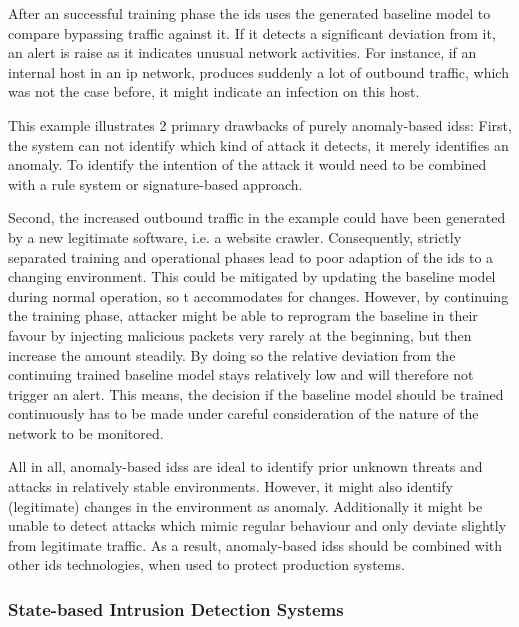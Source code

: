 After an successful training phase the \gls{ids} uses the generated baseline model to compare bypassing traffic against it.
If it detects a significant deviation from it, an alert is raise as it indicates unusual network activities.
For instance, if an internal host in an \gls{ip} network, produces suddenly a lot of outbound traffic, which was not the case before, it might indicate an infection on this host.

This example illustrates 2 primary drawbacks of purely anomaly-based \glspl{ids}: 
First, the system can not identify which kind of attack it detects, it merely identifies an anomaly. To identify the intention of the attack it would need to be combined with a rule system or signature-based approach.

Second, the increased outbound traffic in the example could have been generated by a new legitimate software, i.e. a website crawler.
Consequently, strictly separated training and operational phases lead to poor adaption of the \gls{ids} to a changing environment.
This could be mitigated by updating the baseline model during normal operation, so t accommodates for changes.
However, by continuing the training phase, attacker might be able to reprogram the baseline in their favour by injecting malicious packets very rarely at the beginning, but then increase the amount steadily.
By doing so the relative deviation from the continuing trained baseline model stays relatively low and will therefore not trigger an alert.
This means, the decision if the baseline model should be trained continuously has to be made under careful consideration of the nature of the network to be monitored.

All in all, anomaly-based \glspl{ids} are ideal to identify prior unknown threats and attacks in relatively stable environments. However, it might also identify (legitimate) changes in the environment as anomaly. Additionally it might be unable to detect attacks which mimic regular behaviour and only deviate slightly from legitimate traffic.
As a result, anomaly-based \glspl{ids} should be combined with other \gls{ids} technologies, when used to protect production systems.
\parencite[cf.][pp.~203-204]{Northcutt2005} 
	
\subsubsection{State-based Intrusion Detection Systems}
\label{sec:background:network:ids:state}

